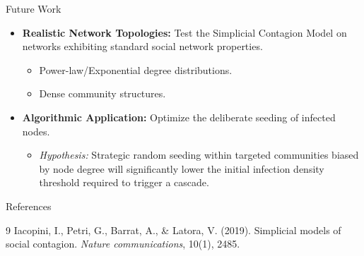 \documentclass[aspectratio=169]{beamer}
\begin{document}
\begin{frame}{Future Work}
    \begin{itemize}
        \item \textbf{Realistic Network Topologies:} Test the Simplicial Contagion Model on networks exhibiting standard social network properties.
        \begin{itemize}
            \item Power-law/Exponential degree distributions.
            \item Dense community structures.
        \end{itemize}
        \item \textbf{Algorithmic Application:} Optimize the deliberate seeding of infected nodes.
        \begin{itemize}
            \item \textit{Hypothesis:} Strategic random seeding within targeted communities biased by node degree will significantly lower the initial infection density threshold required to trigger a cascade.
        \end{itemize}
    \end{itemize}
\end{frame}

\begin{frame}{References}
    \begin{thebibliography}{9}
        Iacopini, I., Petri, G., Barrat, A., \& Latora, V. (2019). 
        \newblock Simplicial models of social contagion. 
        \newblock \textit{Nature communications}, 10(1), 2485.
    \end{thebibliography}
\end{frame}
\end{document}
